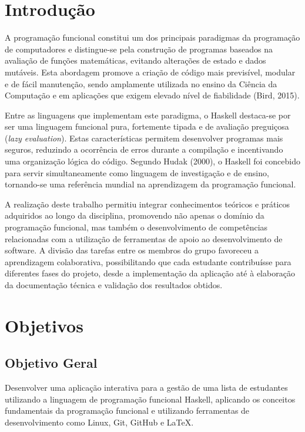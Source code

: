 \documentclass[12pt,a4paper]{article}
\begin{document}
\section{Introdução}
A programação funcional constitui um dos principais paradigmas da programação de computadores e distingue-se pela construção de programas baseados na avaliação de funções matemáticas, evitando alterações de estado e dados mutáveis. Esta abordagem promove a criação de código mais previsível, modular e de fácil manutenção, sendo amplamente utilizada no ensino da Ciência da Computação e em aplicações que exigem elevado nível de fiabilidade (Bird, 2015).

Entre as linguagens que implementam este paradigma, o Haskell destaca-se por ser uma linguagem funcional pura, fortemente tipada e de avaliação preguiçosa (\textit{lazy evaluation}). Estas características permitem desenvolver programas mais seguros, reduzindo a ocorrência de erros durante a compilação e incentivando uma organização lógica do código. Segundo Hudak (2000), o Haskell foi concebido para servir simultaneamente como linguagem de investigação e de ensino, tornando-se uma referência mundial na aprendizagem da programação funcional.

A realização deste trabalho permitiu integrar conhecimentos teóricos e práticos adquiridos ao longo da disciplina, promovendo não apenas o domínio da programação funcional, mas também o desenvolvimento de competências relacionadas com a utilização de ferramentas de apoio ao desenvolvimento de software. A divisão das tarefas entre os membros do grupo favoreceu a aprendizagem colaborativa, possibilitando que cada estudante contribuísse para diferentes fases do projeto, desde a implementação da aplicação até à elaboração da documentação técnica e validação dos resultados obtidos.

\section{Objetivos}

\subsection{Objetivo Geral}
Desenvolver uma aplicação interativa para a gestão de uma lista de estudantes utilizando a linguagem de programação funcional Haskell, aplicando os conceitos fundamentais da programação funcional e utilizando ferramentas de desenvolvimento como Linux, Git, GitHub e LaTeX.
\end{document}

